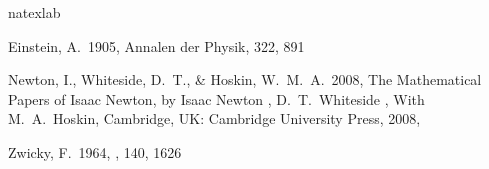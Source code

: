 \documentclass{utthesis}
\begin{document}
\begin{thebibliography}{}
\expandafter\ifx\csname natexlab\endcsname\relax\def\natexlab#1{#1}\fi

 Einstein, A.\ 1905, Annalen der Physik, 322, 891 

 Newton, I., Whiteside, D.~T., \& Hoskin, W.~M.~A.\ 2008, The Mathematical Papers of Isaac Newton, by Isaac Newton , D.~T.~Whiteside , With M.~A.~Hoskin, Cambridge, UK: Cambridge University Press, 2008,  

 Zwicky, F.\ 1964, \apj, 140, 1626 
\end{thebibliography}

\begin{UTvita}
\lipsum[1]
\end{UTvita}
\end{document}
